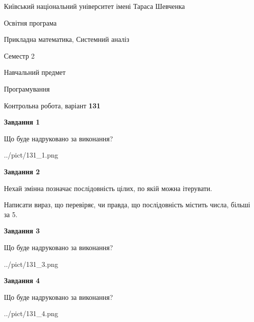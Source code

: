 \documentclass[12pt, ukrainian]{article}
\begin{document}
{{\begin {small}\par
{ \center  Київський національний університет імені Тараса Шевченка \par}
{\parbox {5 cm}{Освітня програма \hfill}{\parbox {8 cm}{Прикладна математика, Системний аналіз \hfill}}\parbox {5 cm}{\hfill Семестр 2}}\par
{\parbox {5 cm} {Навчальний предмет \hfill}\parbox {7 cm}{Програмування \hfill}\parbox {6cm}{\hfill}\par}\vspace{-7pt} \end{small}}{\center Контрольна робота, варіант  \No \textbf
{ 131 }\par}}
{
\begin {large}
{\begin {center}\textbf{Завдання 1}\end {center}}\par
Що буде надруковано за виконання?\par\par
\begin{center}
	{../pict/131_1.png}
\end{center}
\newpage

{\begin {center}\textbf{Завдання 2}\end {center}}\par
Нехай змінна  позначає послідовність цілих, по якій можна ітерувати.

Написати вираз, що перевіряє, чи правда, що послідовність  містить числа, більші за 5.\par
\newpage

{\begin {center}\textbf{Завдання 3}\end {center}}\par
Що буде надруковано за виконання?
\begin{center}
	{../pict/131_3.png}
\end{center}
\newpage

{\begin {center}\textbf{Завдання 4}\end {center}}\par
Що буде надруковано за виконання?\par
\begin{center}
	{../pict/131_4.png}
\end{center}
\newpage


\end{large}}
\end{document}
